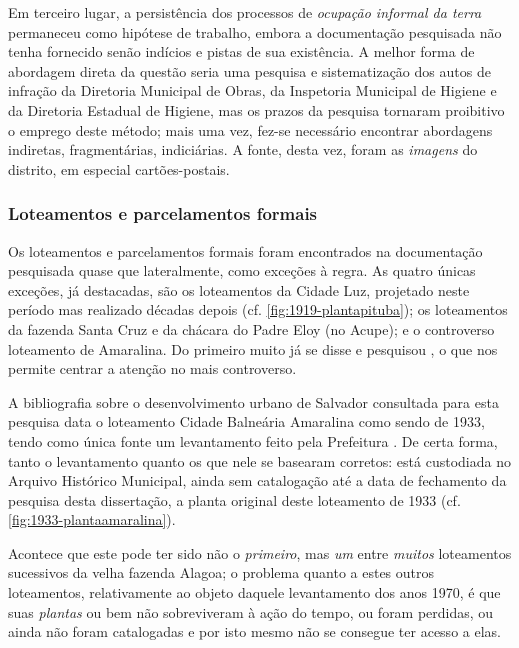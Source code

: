 Em terceiro lugar, a persistência dos processos de \textit{ocupação informal da terra} permaneceu como hipótese de trabalho, embora a documentação pesquisada não tenha fornecido senão indícios e pistas de sua existência. A melhor forma de abordagem direta da questão seria uma pesquisa e sistematização dos autos de infração da Diretoria Municipal de Obras, da Inspetoria Municipal de Higiene e da Diretoria Estadual de Higiene, mas os prazos da pesquisa tornaram proibitivo o emprego deste método; mais uma vez, fez-se necessário encontrar abordagens indiretas, fragmentárias, indiciárias. A fonte, desta vez, foram as \textit{imagens} do distrito, em especial cartões-postais.

\subsubsection{Loteamentos e parcelamentos formais}\label{subsubsec:lotparform}

Os loteamentos e parcelamentos formais foram encontrados na documentação pesquisada quase que lateralmente, como exceções à regra. As quatro únicas exceções, já destacadas, são os loteamentos da Cidade Luz, projetado neste período mas realizado décadas depois (cf. \autoref{fig:1919-plantapituba}); os loteamentos da fazenda Santa Cruz e da chácara do Padre Eloy (no Acupe); e o controverso loteamento de Amaralina. Do primeiro muito já se disse e pesquisou \cite{costa1996theodoro, fernandessampaiogomes1999, salvador_loteamentos_1977, santos_theodoro_2010}, o que nos permite centrar a atenção no mais controverso.

A bibliografia sobre o desenvolvimento urbano de Salvador consultada para esta pesquisa data o loteamento Cidade Balneária Amaralina como sendo de 1933, tendo como única fonte um levantamento feito pela Prefeitura \cite{salvador_loteamentos_1977}. De certa forma, tanto o levantamento quanto os que nele se basearam corretos: está custodiada no Arquivo Histórico Municipal, ainda sem catalogação até a data de fechamento da pesquisa desta dissertação, a planta original deste loteamento de 1933 (cf. \autoref{fig:1933-plantaamaralina}). 

Acontece que este pode ter sido não o \textit{primeiro}, mas \textit{um} entre \textit{muitos} loteamentos sucessivos da velha fazenda Alagoa; o problema quanto a estes outros loteamentos, relativamente ao objeto daquele levantamento dos anos 1970, é que suas \textit{plantas} ou bem não sobreviveram à ação do tempo, ou foram perdidas, ou ainda não foram catalogadas e por isto mesmo não se consegue ter acesso a elas.

